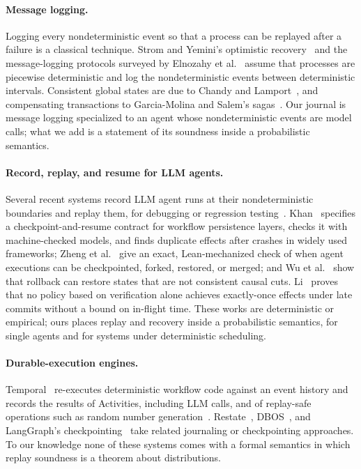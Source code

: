 \paragraph{Message logging.}
Logging every nondeterministic event so that a process can be replayed after a failure is a
classical technique.
Strom and Yemini's optimistic recovery~\citep{strom1985optimistic} and the message-logging
protocols surveyed by Elnozahy et al.~\citep{elnozahy2002survey} assume that processes are
piecewise deterministic and log the nondeterministic events between deterministic intervals.
Consistent global states are due to Chandy and Lamport~\citep{chandy1985snapshots}, and
compensating transactions to Garcia-Molina and Salem's sagas~\citep{garcia1987sagas}.
Our journal is message logging specialized to an agent whose nondeterministic events are model
calls; what we add is a statement of its soundness inside a probabilistic semantics.

\paragraph{Record, replay, and resume for LLM agents.}
Several recent systems record LLM agent runs at their nondeterministic boundaries and replay
them, for debugging or regression testing~\citep{mudasiru2026agrepl,chawla2026chronicle}.
Khan~\citep{khan2026resume} specifies a checkpoint-and-resume contract for workflow persistence
layers, checks it with machine-checked models, and finds duplicate effects after crashes in
widely used frameworks; Zheng et al.~\citep{zheng2026execedits} give an exact, Lean-mechanized
check of when agent executions can be checkpointed, forked, restored, or merged; and Wu et
al.~\citep{wu2026safetoresume} show that rollback can restore states that are not consistent
causal cuts.
Li~\citep{li2026exactlyonce} proves that no policy based on verification alone achieves
exactly-once effects under late commits without a bound on in-flight time.
These works are deterministic or empirical; ours places replay and recovery inside a
probabilistic semantics, for single agents and for systems under deterministic scheduling.

\paragraph{Durable-execution engines.}
Temporal~\citep{temporal2024docs} re-executes deterministic workflow code against an event
history and records the results of Activities, including LLM calls, and of replay-safe
operations such as random number generation~\citep{temporal2026sideeffects}.
Restate~\citep{restate2026}, DBOS~\citep{dbos2026}, and LangGraph's
checkpointing~\citep{langgraph2026persistence} take related journaling or checkpointing
approaches.
To our knowledge none of these systems comes with a formal semantics in which replay soundness
is a theorem about distributions.


